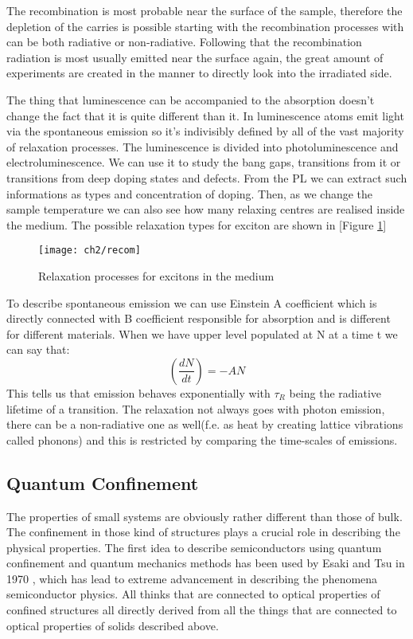 The recombination is most probable near the surface of the sample, therefore the depletion of the carries is possible starting with the recombination processes with can be both radiative or non-radiative. Following that the recombination radiation is most usually emitted near the surface again, the great amount of experiments are created in the manner to directly look into the irradiated side.

The thing that luminescence can be accompanied to the absorption doesn't change the fact that it is quite different than it. In luminescence atoms emit light via the spontaneous emission so it's indivisibly defined by all of the vast majority of relaxation processes. The luminescence is divided into photoluminescence and electroluminescence. We can use it to study the bang gaps, transitions from it or transitions from deep doping states and defects. From the PL we can extract such informations as types and concentration of doping. Then, as we change the sample temperature we can also see how many relaxing centres are realised inside the medium. The possible relaxation types for exciton are shown in [Figure \ref{fig:relax}]
\begin{figure}[H]
\centering
\texttt{[image: ch2/recom]}
\caption{Relaxation processes for excitons in the medium\cite{popko}}
\label{fig:relax}
\end{figure}

To describe spontaneous emission we can use Einstein A coefficient which is directly connected with B coefficient responsible for absorption and is different for different materials. When we have upper level populated at N at a time t we can say that:
\begin{equation}
\left( \frac{dN}{dt} \right) = -AN
\end{equation}
This tells us that emission behaves exponentially with $\tau_R $ being the radiative lifetime of a transition. The relaxation not always goes with photon emission, there can be a non-radiative one as well(f.e. as heat by creating lattice vibrations called phonons) and this is restricted by comparing the time-scales of emissions.  

\subsection{Quantum Confinement}

The properties of small systems are obviously rather different than those of bulk. The confinement in those kind of structures plays a crucial role in describing the physical properties. The first idea to describe semiconductors using quantum confinement and quantum mechanics methods has been used by Esaki and Tsu in 1970 \cite{Esaki1970}, which has lead to extreme advancement in describing the phenomena semiconductor physics. All thinks that are connected to optical properties of confined structures all directly derived from all the things that are connected to optical properties of solids described above. 

